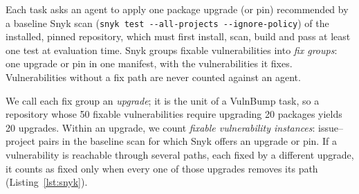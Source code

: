 \documentclass[11pt]{article}
\theoremstyle{definition}
\newcommand{\bench}{VulnBump}
\begin{document}
Each task asks an agent to apply one package upgrade (or pin) recommended by a baseline Snyk scan (\texttt{snyk test -{}-all-projects -{}-ignore-policy}) of the installed, pinned repository, which must first install, scan, build and pass at least one test at evaluation time. Snyk groups fixable vulnerabilities into \emph{fix groups}: one upgrade or pin in one manifest, with the vulnerabilities it fixes. Vulnerabilities without a fix path are never counted against an agent.

We call each fix group an \emph{upgrade}; it is the unit of a \bench{} task, so a repository whose 50 fixable vulnerabilities require upgrading 20 packages yields 20 upgrades. Within an upgrade, we count \emph{fixable vulnerability instances}: issue--project pairs in the baseline scan for which Snyk offers an upgrade or pin. If a vulnerability is reachable through several paths, each fixed by a different upgrade, it counts as fixed only when every one of those upgrades removes its path (Listing~\ref{lst:snyk}).
\end{document}
